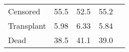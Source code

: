 \documentclass{article}\usepackage[]{graphicx}\usepackage[]{color}
\begin{document}
\begin{table}[H]
\begin{tabular}{>{\raggedright\arraybackslash}p{4cm}cccc}
\hspace{1em}\hspace{1em}Censored & 55.5 & 52.5 & 55.2 & $  $\\
\hspace{1em}\hspace{1em}Transplant & 5.98 & 6.33 & 5.84 & $  $\\
\hspace{1em}\hspace{1em}Dead & 38.5 & 41.1 & 39.0 & $  $\\
\bottomrule
\end{tabular}
\end{table}
\end{document}
